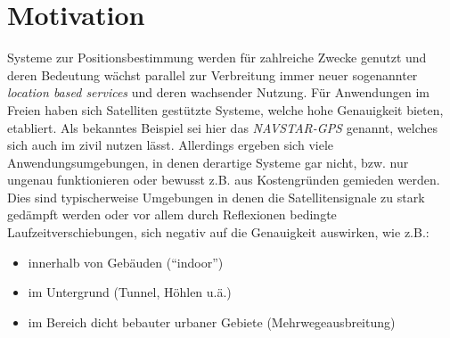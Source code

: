 \section{Motivation} \label{sec:motivation}

Systeme zur Positionsbestimmung werden für zahlreiche Zwecke genutzt und deren
Bedeutung wächst parallel zur Verbreitung immer neuer sogenannter
\textit{location based services} und deren wachsender Nutzung.  Für Anwendungen
im Freien haben sich Satelliten gestützte Systeme, welche hohe Genauigkeit
bieten, etabliert.  Als bekanntes Beispiel sei hier das \textit{NAVSTAR-GPS}
genannt, welches sich auch im zivil nutzen lässt.  Allerdings ergeben sich
viele Anwendungsumgebungen, in denen derartige Systeme gar nicht, bzw.  nur
ungenau funktionieren oder bewusst z.B. aus Kostengründen gemieden werden.
Dies sind typischerweise Umgebungen in denen die Satellitensignale zu stark
gedämpft werden oder vor allem durch Reflexionen bedingte
Laufzeitverschiebungen, sich negativ auf die Genauigkeit auswirken, wie z.B.: 


\begin{itemize} 
  \item innerhalb von Gebäuden (``indoor'') 
  \item im Untergrund (Tunnel, Höhlen u.ä.) 
  \item im Bereich dicht bebauter urbaner Gebiete
    (Mehrwegeausbreitung) \end{itemize}

